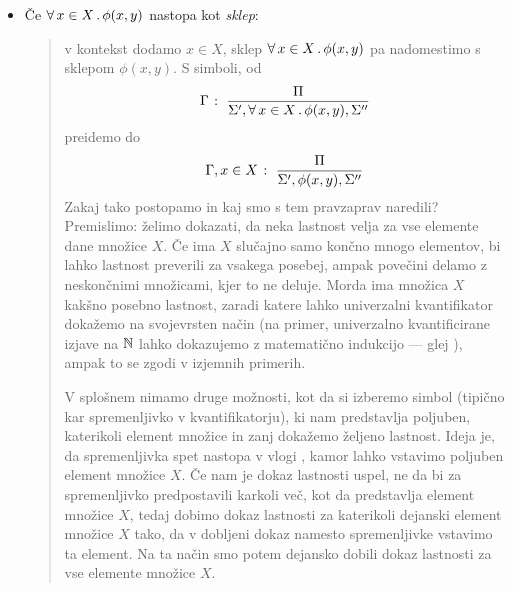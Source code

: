 \begin{itemize}
\begin{itemize}
\begin{quote}
					\end{quote}
				\item
					Če $\xall{x}[X]{\phi(x, y)}$ nastopa kot \emph{sklep}:
					\begin{quote}
						v kontekst dodamo $x \in X$, sklep $\xall{x}[X]{\phi(x, y)}$ pa nadomestimo s sklepom $\phi(x, y)$. S simboli, od
						\[\claim{\Gamma}{\Pi}{\Sigma', \xall{x}[X]{\phi(x, y)}, \Sigma''}\]
						preidemo do
						\[{\Gamma, x \in X} \;\colon\; \frac{\Pi}{\Sigma', \phi(x, y), \Sigma''}\]
						Zakaj tako postopamo in kaj smo s tem pravzaprav naredili? Premislimo: želimo dokazati, da neka lastnost velja za vse elemente dane množice $X$. Če ima $X$ slučajno samo končno mnogo elementov, bi lahko lastnost preverili za vsakega posebej, ampak povečini delamo z neskončnimi množicami, kjer to ne deluje. Morda ima množica $X$ kakšno posebno lastnost, zaradi katere lahko univerzalni kvantifikator dokažemo na svojevrsten način (na primer, univerzalno kvantificirane izjave na $\mathbb{N}$ lahko dokazujemo z matematično indukcijo --- glej ), ampak to se zgodi v izjemnih primerih.
						
						V splošnem nimamo druge možnosti, kot da si izberemo simbol (tipično kar spremenljivko v kvantifikatorju), ki nam predstavlja poljuben, katerikoli element množice in zanj dokažemo željeno lastnost. Ideja je, da spremenljivka spet nastopa v vlogi , kamor lahko vstavimo poljuben element množice $X$. Če nam je dokaz lastnosti uspel, ne da bi za spremenljivko predpostavili karkoli več, kot da predstavlja element množice $X$, tedaj dobimo dokaz lastnosti za katerikoli dejanski element množice $X$ tako, da v dobljeni dokaz namesto spremenljivke vstavimo ta element. Na ta način smo potem dejansko dobili dokaz lastnosti za vse elemente množice $X$.
						

\end{quote}
\end{itemize}
\end{itemize}
